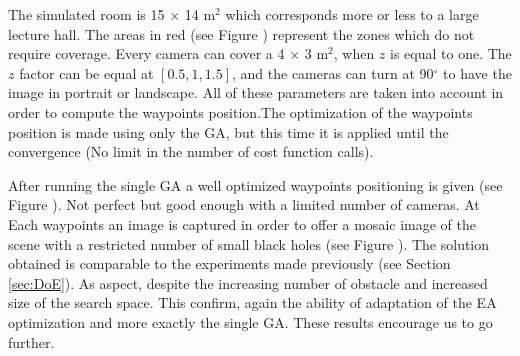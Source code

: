 	The simulated room is 15 $\times$ 14 m$^2$ which corresponds more or less to a large lecture hall. The areas in red (see Figure ) represent the zones which do not require coverage. Every camera can cover a 4 $\times$ 3 m$^2$,  when $z$ is equal to one. The $z$ factor can be equal at $[0.5, 1, 1.5]$, and the cameras can turn  at 90$^{\circ}$ to have the image in portrait or landscape. All of these parameters are taken into account in order to compute the waypoints position.The optimization of the waypoints position is made using  only the GA, but this time it is applied until the convergence (No limit in the number of cost function calls). 
	
	 After running the single GA  a well optimized waypoints positioning is given (see Figure ). Not perfect but good enough with a limited number of cameras. At Each waypoints an image is captured in order to offer a  mosaic image of the scene with a restricted number of small black holes (see Figure ).
	  The solution obtained is comparable to the experiments made previously (see Section \ref{sec:DoE}). As aspect, despite the increasing number of obstacle and increased size of the search space. This confirm, again the ability of adaptation of the EA optimization and more exactly the single GA. These results encourage us to go  further. 


 




